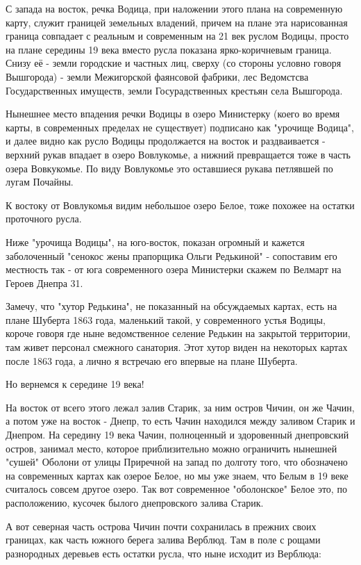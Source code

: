 С запада на восток, речка Водица, при наложении этого плана на современную карту, служит границей земельных владений, причем на плане эта нарисованная граница совпадает с реальным и современным на 21 век руслом Водицы, просто на плане середины 19 века вместо русла показана ярко-коричневым граница. Снизу её - земли городские и частных лиц, сверху (со стороны условно говоря Вышгорода) - земли Межигорской фаянсовой фабрики, лес Ведомстсва Государственных имуществ, земли Госурадственных крестьян села Вышгорода.

Нынешнее место впадения речки Водицы в озеро Министерку (коего во время карты, в современных пределах не существует) подписано как "урочище Водица", и далее видно как русло Водицы продолжается на восток и раздваивается - верхний рукав впадает в озеро Вовлукомье, а нижний превращается тоже в часть озера Вовкукомье. По виду Вовлукомье это оставшиеся рукава петлявшей по лугам Почайны.

К востоку от Вовлукомья видим небольшое озеро Белое, тоже похожее на остатки проточного русла.

Ниже "урочища Водицы", на юго-восток, показан огромный и кажется заболоченный "сенокос жены прапорщика Ольги Редькиной" - сопоставим его местность так - от юга современного озера Министерки скажем по Велмарт на Героев Днепра 31.

Замечу, что "хутор Редькина", не показанный на обсуждаемых картах, есть на плане Шуберта 1863 года, маленький такой, у современного устья Водицы, короче говоря где ныне ведомственное селение Редькин на закрытой территории, там живет персонал смежного санатория. Этот хутор виден на некоторых картах после 1863 года, а лично я встречаю его впервые на плане Шуберта.

Но вернемся к середине 19 века!

На восток от всего этого лежал залив Старик, за ним остров Чичин, он же Чачин, а потом уже на восток - Днепр, то есть Чачин находился между заливом Старик и Днепром. На середину 19 века Чачин, полноценный и здоровенный днепровский остров, занимал место, которое приблизительно можно ограничить нынешней "сушей" Оболони от улицы Приречной на запад по долготу того, что обозначено на современных картах как озерое Белое, но мы уже знаем, что Белым в 19 веке считалось совсем другое озеро. Так вот современное "оболонское" Белое это, по расположению, кусочек былого днепровского залива Старик.

А вот северная часть острова Чичин почти сохранилась в прежних своих границах, как часть южного берега залива Верблюд. Там в поле с рощами разнородных деревьев есть остатки русла, что ныне исходит из Верблюда:

